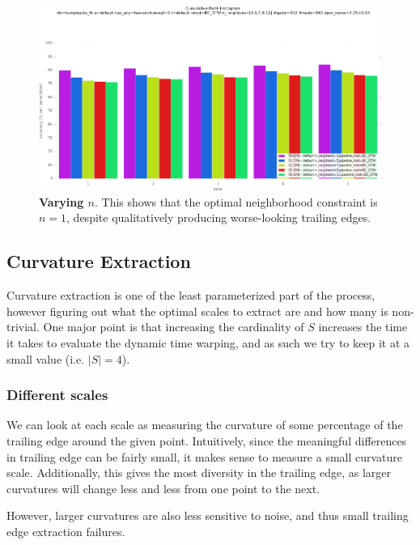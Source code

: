 \begin{figure}[t]%
\centering
\includegraphics[width=1\textwidth]{../images/results/vary_neighbors.png}
\caption[]{\textbf{Varying $n$}. This shows that the optimal neighborhood constraint is $n = 1$, despite qualitatively producing worse-looking trailing edges.}
\label{fig:vary_neighbors}
\end{figure}



\subsection{Curvature Extraction}

Curvature extraction is one of the least parameterized part of the process, however figuring out what the optimal scales to extract are and how many is non-trivial.
One major point is that increasing the cardinality of $S$ increases the time it takes to evaluate the dynamic time warping, and as such we try to keep it at a small value (i.e. $|S| = 4$).

\subsubsection{Different scales}

We can look at each scale as measuring the curvature of some percentage of the trailing edge around the given point.
Intuitively, since the meaningful differences in trailing edge can be fairly small, it makes sense to measure a small curvature scale.
Additionally, this gives the most diversity in the trailing edge, as larger curvatures will change less and less from one point to the next.

However, larger curvatures are also less sensitive to noise, and thus small trailing edge extraction failures.


